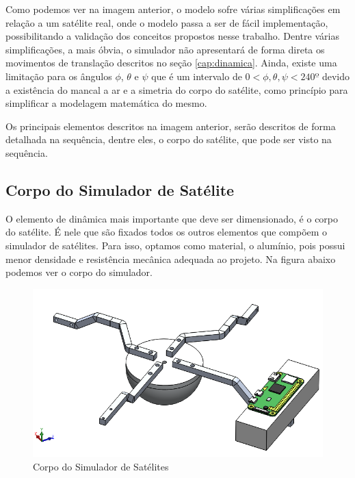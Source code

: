  Como podemos ver na imagem anterior, o modelo sofre várias simplificações em relação a um satélite real, onde o modelo passa a ser de fácil implementação, possibilitando a validação dos conceitos propostos nesse trabalho. Dentre várias simplificações, a mais óbvia, o simulador não apresentará de forma direta os movimentos de translação descritos no seção \ref{cap:dinamica}. Ainda, existe uma limitação para os ângulos $\phi$, $\theta$ e $\psi$ que é um intervalo de $0<\phi, \theta, \psi<240º$ devido a existência do mancal a ar e a simetria do corpo do satélite, como princípio para simplificar a modelagem matemática do mesmo.

Os principais elementos descritos na imagem anterior, serão descritos de forma detalhada na sequência, dentre eles, o corpo do satélite, que pode ser visto na sequência.



\subsection{Corpo do Simulador de Satélite}

O elemento de dinâmica mais importante que deve ser dimensionado, é o corpo do satélite. É nele que são fixados todos os outros elementos que compõem o simulador de satélites. Para isso, optamos como material, o alumínio, pois possui menor densidade e resistência mecânica adequada ao projeto. Na figura abaixo podemos ver o corpo do simulador.

\begin{figure}[H]
  \caption{Corpo do Simulador de Satélites}
  \begin{center}
      \includegraphics[scale=.45]{metodologia/img/corpo_satelite}
  \end{center}
  \label{fig:corpo_satelite}
\end{figure}


